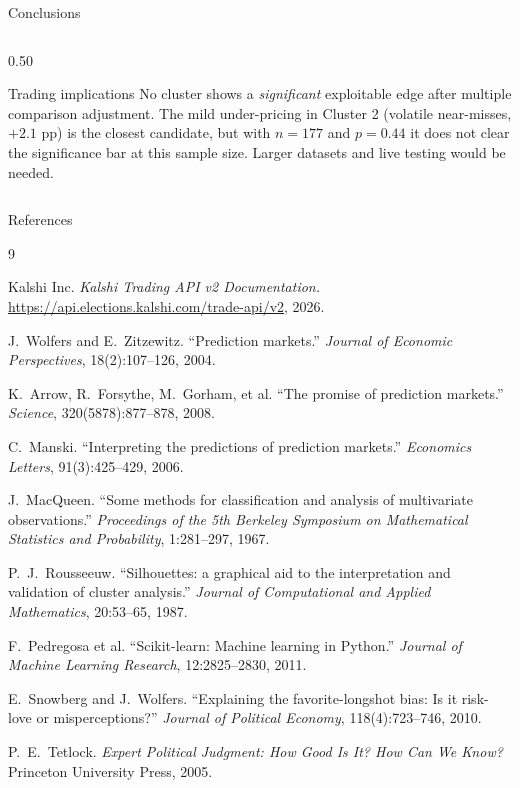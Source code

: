 \documentclass[10pt, aspectratio=169]{beamer}
\begin{document}
\begin{frame}{Conclusions}
\begin{columns}[T]
\begin{column}{0.50\textwidth}
      \medskip
      \begin{block}{Trading implications}
        No cluster shows a \emph{significant} exploitable
        edge after multiple comparison adjustment.
        The mild under-pricing in Cluster 2 (volatile
        near-misses, $+2.1$ pp) is the closest candidate,
        but with $n=177$ and $p=0.44$ it does not clear
        the significance bar at this sample size.
        Larger datasets and live testing would be needed.
      \end{block}
    \end{column}
  \end{columns}
\end{frame}

\begin{frame}[allowframebreaks]{References}
  \footnotesize
  \begin{thebibliography}{9}

    Kalshi Inc.
    \textit{Kalshi Trading API v2 Documentation.}
    \url{https://api.elections.kalshi.com/trade-api/v2}, 2026.

    J.\ Wolfers and E.\ Zitzewitz.
    ``Prediction markets.''
    \textit{Journal of Economic Perspectives}, 18(2):107--126, 2004.

    K.\ Arrow, R.\ Forsythe, M.\ Gorham, et al.
    ``The promise of prediction markets.''
    \textit{Science}, 320(5878):877--878, 2008.

    C.\ Manski.
    ``Interpreting the predictions of prediction markets.''
    \textit{Economics Letters}, 91(3):425--429, 2006.

    J.\ MacQueen.
    ``Some methods for classification and analysis of
    multivariate observations.''
    \textit{Proceedings of the 5th Berkeley Symposium on
    Mathematical Statistics and Probability}, 1:281--297, 1967.

    P.\ J.\ Rousseeuw.
    ``Silhouettes: a graphical aid to the interpretation
    and validation of cluster analysis.''
    \textit{Journal of Computational and Applied Mathematics},
    20:53--65, 1987.

    F.\ Pedregosa et al.
    ``Scikit-learn: Machine learning in Python.''
    \textit{Journal of Machine Learning Research},
    12:2825--2830, 2011.

    E.\ Snowberg and J.\ Wolfers.
    ``Explaining the favorite-longshot bias: Is it risk-love
    or misperceptions?''
    \textit{Journal of Political Economy}, 118(4):723--746, 2010.

    P.\ E.\ Tetlock.
    \textit{Expert Political Judgment: How Good Is It?
    How Can We Know?}
    Princeton University Press, 2005.

  \end{thebibliography}
\end{frame}

\end{document}
